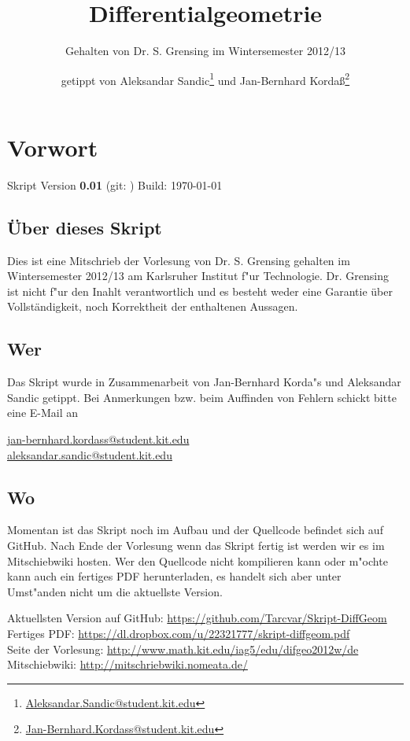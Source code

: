 \documentclass[paper=A4, twoside, chapterprefix=true, bibliography=totoc, headsepline]{scrbook}
\title{Differentialgeometrie}
\subtitle{Gehalten von Dr. S. Grensing im Wintersemester 2012/13}
\author{getippt von Aleksandar Sandic\thanks{\href{mailto:aleksandar.sandic@student.kit.edu}{Aleksandar.Sandic@student.kit.edu}} und Jan-Bernhard Korda\ss\thanks{\href{mailto:jan-bernhard.kordass@student.kit.edu}{Jan-Bernhard.Kordass@student.kit.edu}}}
\begin{document}
\maketitle

\setlength\parskip{0.6pt}
\tableofcontents

\chapter*{Vorwort}
\setlength\parskip{\smallskipamount} Skript Version \textbf{0.01}
(git: \GITAbrHash) \quad Build: \today

\section*{\"Uber dieses Skript}
Dies ist eine Mitschrieb der Vorlesung 
von Dr. S. Grensing gehalten im Wintersemester 2012/13 am Karlsruher
Institut f"ur Technologie. Dr. Grensing ist nicht f"ur den Inahlt
verantwortlich und es besteht weder eine Garantie über
Vollständigkeit, noch Korrektheit der enthaltenen Aussagen.

\section*{Wer}
Das Skript wurde in Zusammenarbeit von Jan-Bernhard Korda"s und
Aleksandar Sandic getippt. Bei Anmerkungen bzw. beim Auffinden von
Fehlern schickt bitte eine E-Mail an
\begin{center}
  \href{mailto:jan-bernhard.kordass@student.kit.edu}{jan-bernhard.kordass@student.kit.edu}\\
  \href{mailto:aleksandar.sandic@student.kit.edu}{aleksandar.sandic@student.kit.edu}
\end{center}

\section*{Wo}
Momentan ist das Skript noch im Aufbau und der Quellcode befindet sich
auf GitHub. Nach Ende der Vorlesung wenn das Skript fertig ist werden
wir es im Mitschiebwiki hosten. Wer den Quellcode nicht kompilieren
kann oder m"ochte kann auch ein fertiges PDF herunterladen, es handelt
sich aber unter Umst"anden nicht um die aktuellste Version.

Aktuellsten Version auf GitHub: \url{https://github.com/Tarcvar/Skript-DiffGeom}\\
Fertiges PDF: \url{https://dl.dropbox.com/u/22321777/skript-diffgeom.pdf}\\
Seite der Vorlesung: \url{http://www.math.kit.edu/iag5/edu/difgeo2012w/de}\\
Mitschiebwiki: \url{http://mitschriebwiki.nomeata.de/}
\end{document}
